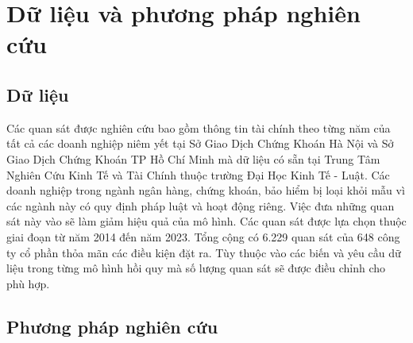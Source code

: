 \documentclass[a4paper]{article}
\begin{document}
\section{Dữ liệu và phương pháp nghiên cứu}
\subsection{Dữ liệu}
Các quan sát được nghiên cứu bao gồm thông tin tài chính theo từng năm của tất cả các doanh nghiệp niêm yết tại Sở Giao Dịch Chứng Khoán Hà Nội và Sở Giao Dịch Chứng Khoán TP Hồ Chí Minh mà dữ liệu có sẵn tại Trung Tâm Nghiên Cứu Kinh Tế và Tài Chính thuộc trường Đại Học Kinh Tế - Luật. Các doanh nghiệp trong ngành ngân hàng, chứng khoán, bảo hiểm bị loại khỏi mẫu vì các ngành này có quy định pháp luật và hoạt động riêng. Việc đưa những quan sát này vào sẽ làm giảm hiệu quả của mô hình. Các quan sát được lựa chọn thuộc giai đoạn từ năm 2014 đến năm 2023. Tổng cộng có 6.229 quan sát của 648 công ty cổ phần thỏa mãn các điều kiện đặt ra. Tùy thuộc vào các biến và yêu cầu dữ liệu trong từng mô hình hồi quy mà số lượng quan sát sẽ được điều chỉnh cho phù hợp.
\subsection{Phương pháp nghiên cứu}
\end{document}
